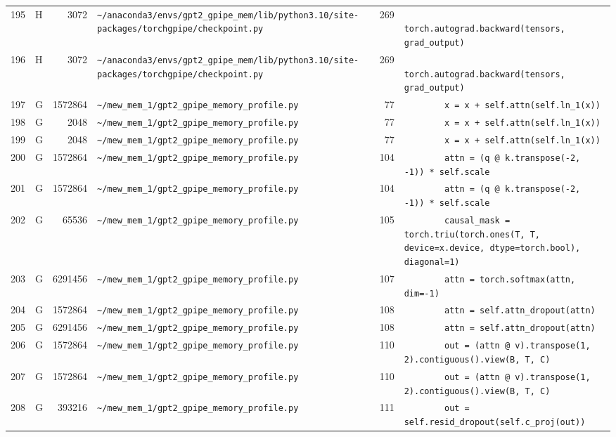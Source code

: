 \documentclass{article}
\begin{document}
\begin{longtable}{r l r p{6.5cm} r p{7.0cm}}
195 & H & 3072 & \lstinline|~/anaconda3/envs/gpt2_gpipe_mem/lib/python3.10/site-packages/torchgpipe/checkpoint.py| & 269 & \lstinline|            torch.autograd.backward(tensors, grad_output)| \\
196 & H & 3072 & \lstinline|~/anaconda3/envs/gpt2_gpipe_mem/lib/python3.10/site-packages/torchgpipe/checkpoint.py| & 269 & \lstinline|            torch.autograd.backward(tensors, grad_output)| \\
197 & G & 1572864 & \lstinline|~/mew_mem_1/gpt2_gpipe_memory_profile.py| & 77 & \lstinline|        x = x + self.attn(self.ln_1(x))| \\
198 & G & 2048 & \lstinline|~/mew_mem_1/gpt2_gpipe_memory_profile.py| & 77 & \lstinline|        x = x + self.attn(self.ln_1(x))| \\
199 & G & 2048 & \lstinline|~/mew_mem_1/gpt2_gpipe_memory_profile.py| & 77 & \lstinline|        x = x + self.attn(self.ln_1(x))| \\
200 & G & 1572864 & \lstinline|~/mew_mem_1/gpt2_gpipe_memory_profile.py| & 104 & \lstinline|        attn = (q @ k.transpose(-2, -1)) * self.scale| \\
201 & G & 1572864 & \lstinline|~/mew_mem_1/gpt2_gpipe_memory_profile.py| & 104 & \lstinline|        attn = (q @ k.transpose(-2, -1)) * self.scale| \\
202 & G & 65536 & \lstinline|~/mew_mem_1/gpt2_gpipe_memory_profile.py| & 105 & \lstinline|        causal_mask = torch.triu(torch.ones(T, T, device=x.device, dtype=torch.bool), diagonal=1)| \\
203 & G & 6291456 & \lstinline|~/mew_mem_1/gpt2_gpipe_memory_profile.py| & 107 & \lstinline|        attn = torch.softmax(attn, dim=-1)| \\
204 & G & 1572864 & \lstinline|~/mew_mem_1/gpt2_gpipe_memory_profile.py| & 108 & \lstinline|        attn = self.attn_dropout(attn)| \\
205 & G & 6291456 & \lstinline|~/mew_mem_1/gpt2_gpipe_memory_profile.py| & 108 & \lstinline|        attn = self.attn_dropout(attn)| \\
206 & G & 1572864 & \lstinline|~/mew_mem_1/gpt2_gpipe_memory_profile.py| & 110 & \lstinline|        out = (attn @ v).transpose(1, 2).contiguous().view(B, T, C)| \\
207 & G & 1572864 & \lstinline|~/mew_mem_1/gpt2_gpipe_memory_profile.py| & 110 & \lstinline|        out = (attn @ v).transpose(1, 2).contiguous().view(B, T, C)| \\
208 & G & 393216 & \lstinline|~/mew_mem_1/gpt2_gpipe_memory_profile.py| & 111 & \lstinline|        out = self.resid_dropout(self.c_proj(out))| \\

\end{longtable}
\end{document}
